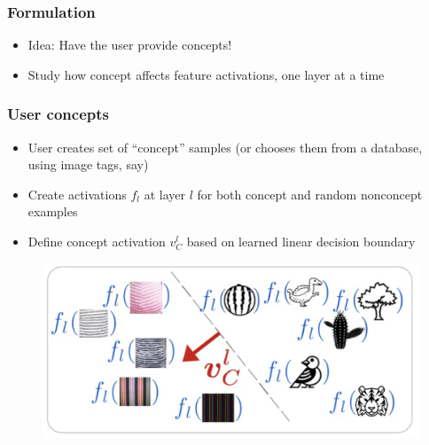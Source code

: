\documentclass[10pt,mathserif]{beamer}
\begin{document}
\begin{frame}
  \frametitle{Formulation}
  \begin{itemize}
  \item Idea: Have the user provide concepts!
  \item Study how concept affects feature activations, one layer at a time
  \end{itemize} 
\end{frame}

\begin{frame}
  \frametitle{User concepts}
  \begin{itemize}
  \item User creates set of ``concept'' samples (or chooses them from a
    database, using image tags, say)
  \item Create activations $f_{l}$ at layer $l$ for both concept and random
    nonconcept examples
  \item Define concept activation $v_{C}^l$ based on learned linear decision
    boundary
  \end{itemize} 
  \begin{figure}[ht]
    \centering
    \includegraphics[width=0.6\paperwidth]{figure/cav_space}
    \caption{\label{fig:label} }
  \end{figure}
\end{frame}
\end{document}

